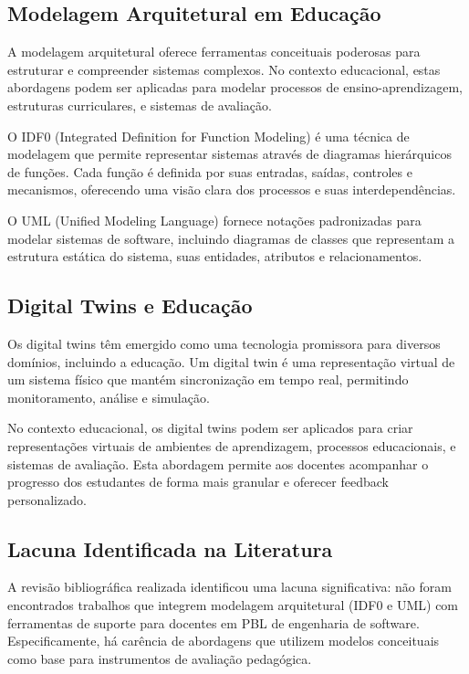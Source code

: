 \documentclass[english, spanish, brazilian]{RBIEarticle} %
\begin{document}
\subsection{Modelagem Arquitetural em Educação}

A modelagem arquitetural oferece ferramentas conceituais poderosas para estruturar e compreender sistemas complexos. No contexto educacional, estas abordagens podem ser aplicadas para modelar processos de ensino-aprendizagem, estruturas curriculares, e sistemas de avaliação.

O IDF0 (Integrated Definition for Function Modeling) é uma técnica de modelagem que permite representar sistemas através de diagramas hierárquicos de funções. Cada função é definida por suas entradas, saídas, controles e mecanismos, oferecendo uma visão clara dos processos e suas interdependências.

O UML (Unified Modeling Language) fornece notações padronizadas para modelar sistemas de software, incluindo diagramas de classes que representam a estrutura estática do sistema, suas entidades, atributos e relacionamentos.

\subsection{Digital Twins e Educação}

Os digital twins têm emergido como uma tecnologia promissora para diversos domínios, incluindo a educação. Um digital twin é uma representação virtual de um sistema físico que mantém sincronização em tempo real, permitindo monitoramento, análise e simulação.

No contexto educacional, os digital twins podem ser aplicados para criar representações virtuais de ambientes de aprendizagem, processos educacionais, e sistemas de avaliação. Esta abordagem permite aos docentes acompanhar o progresso dos estudantes de forma mais granular e oferecer feedback personalizado.

\subsection{Lacuna Identificada na Literatura}

A revisão bibliográfica realizada identificou uma lacuna significativa: não foram encontrados trabalhos que integrem modelagem arquitetural (IDF0 e UML) com ferramentas de suporte para docentes em PBL de engenharia de software. Especificamente, há carência de abordagens que utilizem modelos conceituais como base para instrumentos de avaliação pedagógica.
\end{document}
